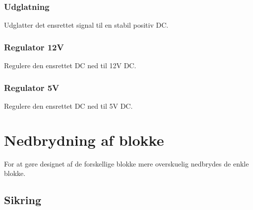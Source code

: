 \subsubsection{Udglatning}
Udglatter det ensrettet signal til en stabil positiv DC. 
\subsubsection{Regulator 12V}
Regulere den ensrettet DC ned til 12V DC.
\subsubsection{Regulator 5V}
Regulere den ensrettet DC ned til 5V DC.
\newpage
\section{Nedbrydning af blokke}
For at gøre designet af de forskellige blokke mere overskuelig nedbrydes de enkle blokke.
\subsection{Sikring}

